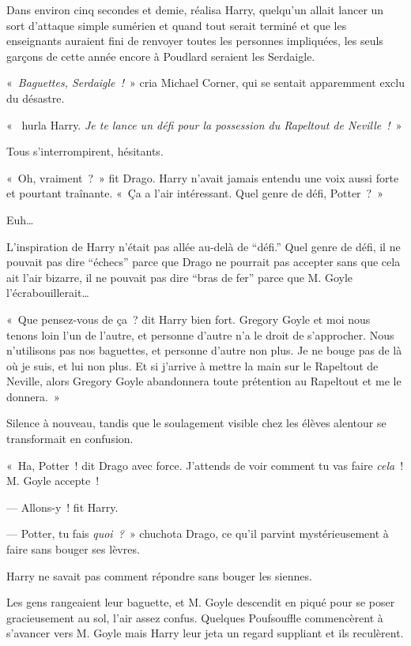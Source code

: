 Dans environ cinq secondes et demie, réalisa Harry, quelqu'un allait lancer un sort d'attaque simple sumérien et quand tout serait terminé et que les enseignants auraient fini de renvoyer toutes les personnes impliquées, les seuls garçons de cette année encore à Poudlard seraient les Serdaigle.

«~\emph{Baguettes, Serdaigle~!}~» cria Michael Corner, qui se sentait apparemment exclu du désastre.

«~ hurla Harry. \emph{Je te lance un défi pour la possession du Rapeltout de Neville~!}~»

Tous s'interrompirent, hésitants.

«~Oh, vraiment~?~» fit Drago. Harry n'avait jamais entendu une voix aussi forte et pourtant traînante.
«~Ça a l'air intéressant. Quel genre de défi, Potter~?~»

Euh…

L'inspiration de Harry n'était pas allée au-delà de “défi.”
Quel genre de défi, il ne pouvait pas dire “échecs” parce que Drago ne pourrait pas accepter sans que cela ait l'air bizarre, il ne pouvait pas dire “bras de fer” parce que M. Goyle l'écrabouillerait…

«~Que pensez-vous de ça~? dit Harry bien fort.
Gregory Goyle et moi nous tenons loin l'un de l'autre, et personne d'autre n'a le droit de s'approcher.
Nous n'utilisons pas nos baguettes, et personne d'autre non plus.
Je ne bouge pas de là où je suis, et lui non plus.
Et si j'arrive à mettre la main sur le Rapeltout de Neville, alors Gregory Goyle abandonnera toute prétention au Rapeltout et me le donnera.~»

Silence à nouveau, tandis que le soulagement visible chez les élèves alentour se transformait en confusion.

«~Ha, Potter~! dit Drago avec force.
J'attends de voir comment tu vas faire \emph{cela}~! M. Goyle accepte~!

--- Allons-y~! fit Harry.

--- Potter, tu fais \emph{quoi~?}~» chuchota Drago, ce qu'il parvint mystérieusement à faire sans bouger ses lèvres.

Harry ne savait pas comment répondre sans bouger les siennes.

Les gens rangeaient leur baguette, et M. Goyle descendit en piqué pour se poser gracieusement au sol, l'air assez confus.
Quelques Poufsouffle commencèrent à s'avancer vers M. Goyle mais Harry leur jeta un regard suppliant et ils reculèrent.

